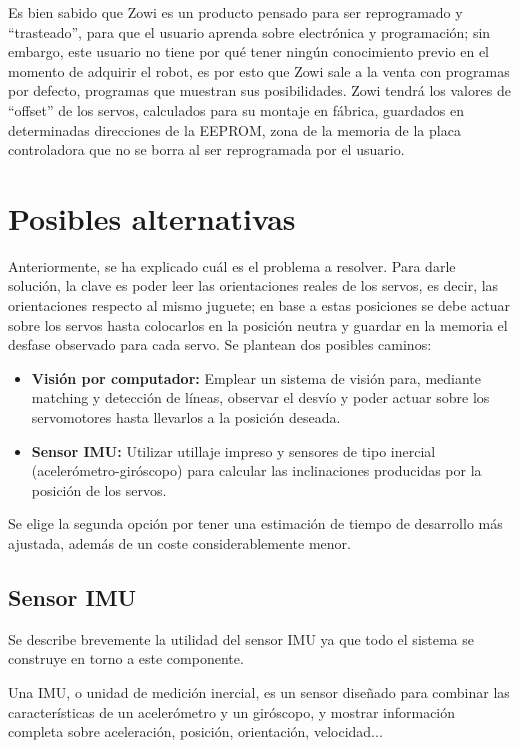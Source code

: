 Es bien sabido que Zowi es un producto pensado para ser reprogramado y ``trasteado'', para que el usuario aprenda sobre electrónica y programación; sin embargo, este usuario no tiene por qué tener ningún conocimiento previo en el momento de adquirir el robot, es por esto que Zowi sale a la venta con programas por defecto, programas que muestran sus posibilidades. Zowi tendrá los valores de ``offset'' de los servos, calculados para su montaje en fábrica, guardados en determinadas direcciones de la EEPROM, zona de la memoria de la placa controladora que no se borra al ser reprogramada por el usuario.

\section{Posibles alternativas}

Anteriormente, se ha explicado cuál es el problema a resolver. Para darle solución, la clave es poder leer las orientaciones reales de los servos, es decir, las orientaciones respecto al mismo juguete; en base a estas posiciones se debe actuar sobre los servos hasta colocarlos en la posición neutra y guardar en la memoria el desfase observado para cada servo. Se plantean dos posibles caminos:

\begin{itemize}
  \item \textbf{Visión por computador:} Emplear un sistema de visión para, mediante matching y detección de líneas, observar el desvío y poder actuar sobre los servomotores hasta llevarlos a la posición deseada.
  \item \textbf{Sensor IMU:} Utilizar utillaje impreso y sensores de tipo inercial (acelerómetro-giróscopo) para calcular las inclinaciones producidas por la posición de los servos.
\end{itemize}

Se elige la segunda opción por tener una estimación de tiempo de desarrollo más ajustada, además de un coste considerablemente menor.

\subsection{Sensor IMU}
Se describe brevemente la utilidad del sensor IMU ya que todo el sistema se construye en torno a este componente.

Una IMU, o unidad de medición inercial, es un sensor diseñado para combinar las características de un acelerómetro y un giróscopo, y mostrar información completa sobre aceleración, posición, orientación, velocidad...

